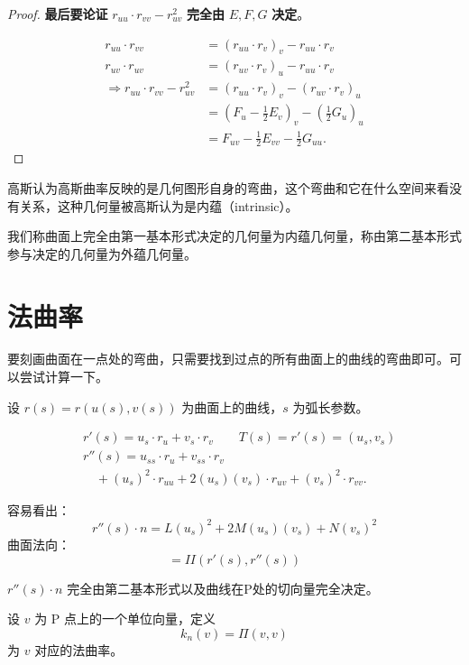 \documentclass[lang=cn,10pt,thmcnt=section]{elegantbook}
\begin{document}
\begin{proof}
        \textbf{最后要论证} $r_{uu} \cdot r_{vv} - r_{uv}^2$ \textbf{完全由} $E, F, G$ \textbf{决定}。
        
        \begin{align*}
        r_{uu} \cdot r_{vv} &= (r_{uu} \cdot r_{v})_v - r_{uu} \cdot r_{v} \\
        r_{uv} \cdot r_{uv} &= (r_{uv} \cdot r_{v})_u - r_{uu} \cdot r_{v} \\
        \Rightarrow r_{uu} \cdot r_{vv} - r_{uv}^2 &= (r_{uu} \cdot r_{v})_v - (r_{uv} \cdot r_{v})_u \\
        &= (F_u - \frac{1}{2} E_v)_v - (\frac{1}{2} G_u)_u \\
        &= F_{uv} - \frac{1}{2} E_{vv} - \frac{1}{2} G_{uu}.
        \end{align*}
\end{proof}

高斯认为高斯曲率反映的是几何图形自身的弯曲，这个弯曲和它在什么空间来看没有关系，这种几何量被高斯认为是内蕴（intrinsic）。
\begin{definition}
    我们称曲面上完全由第一基本形式决定的几何量为内蕴几何量，称由第二基本形式参与决定的几何量为外蕴几何量。
\end{definition}

\section{法曲率}

要刻画曲面在一点处的弯曲，只需要找到过点的所有曲面上的曲线的弯曲即可。可以尝试计算一下。

设 $r(s) = r(u(s), v(s))$ 为曲面上的曲线，$s$ 为弧长参数。


\begin{equation*}
    \begin{aligned}
    &r'(s) = u_s \cdot r_u + v_s \cdot r_v \qquad T(s) = r'(s) = (u_s, v_s) \\
    &r''(s) = u_{ss} \cdot r_u + v_{ss} \cdot r_v \\
    &\quad + (u_s)^2 \cdot r_{uu} + 2(u_s)(v_s) \cdot r_{uv} + (v_s)^2 \cdot r_{vv}.
    \end{aligned}
    \end{equation*}
    
    容易看出：
    \begin{equation*}
    r''(s) \cdot n = L(u_s)^2 + 2M(u_s)(v_s) + N(v_s)^2
    \end{equation*}
    曲面法向：
    \begin{equation*}
    = II (r'(s), r''(s))
    \end{equation*}
    \begin{proposition}
        $r''(s) \cdot n$ 完全由第二基本形式以及曲线在P处的切向量完全决定。
    \end{proposition}
\begin{definition}[法曲率]
    设 $v$ 为 P 点上的一个单位向量，定义
\[ k_n(v) = \Pi(v,v) \]
为 $v$ 对应的法曲率。
\end{definition}
\end{document}
